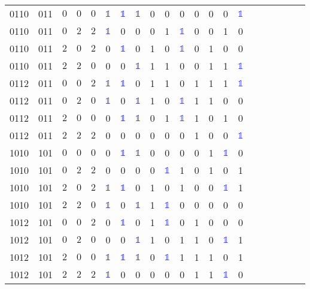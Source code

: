 \begin{longtable*}{c| cccccccccccccccccccc }
0110& 011& $0$& $0$& $0$& \textcolor{blue}{$\mathds{1}$}& \textcolor{blue}{$\mathds{1}$}& \textcolor{blue}{$\mathds{1}$}& 0& 0& 0& 0& 0& 0& \textcolor{blue}{$\mathds{1}$}\\
0110& 011& $0$& $2$& $2$& \textcolor{blue}{$\mathds{1}$}& 0& 0& 0& 1& \textcolor{blue}{$\mathds{1}$}& 0& 0& 1& 0\\
0110& 011& $2$& $0$& $2$& 0& \textcolor{blue}{$\mathds{1}$}& 0& 1& 0& \textcolor{blue}{$\mathds{1}$}& 0& 1& 0& 0\\
0110& 011& $2$& $2$& $0$& 0& 0& \textcolor{blue}{$\mathds{1}$}& 1& 1& 0& 0& 1& 1& \textcolor{blue}{$\mathds{1}$}\\
0112& 011& $0$& $0$& $2$& \textcolor{blue}{$\mathds{1}$}& \textcolor{blue}{$\mathds{1}$}& 0& 1& 1& 0& 1& 1& 1& \textcolor{blue}{$\mathds{1}$}\\
0112& 011& $0$& $2$& $0$& \textcolor{blue}{$\mathds{1}$}& 0& \textcolor{blue}{$\mathds{1}$}& 1& 0& \textcolor{blue}{$\mathds{1}$}& 1& 1& 0& 0\\
0112& 011& $2$& $0$& $0$& 0& \textcolor{blue}{$\mathds{1}$}& \textcolor{blue}{$\mathds{1}$}& 0& 1& \textcolor{blue}{$\mathds{1}$}& 1& 0& 1& 0\\
0112& 011& $2$& $2$& $2$& 0& 0& 0& 0& 0& 0& 1& 0& 0& \textcolor{blue}{$\mathds{1}$}\\
1010& 101& $0$& $0$& $0$& 0& \textcolor{blue}{$\mathds{1}$}& \textcolor{blue}{$\mathds{1}$}& 0& 0& 0& 0& 1& \textcolor{blue}{$\mathds{1}$}& 0\\
1010& 101& $0$& $2$& $2$& 0& 0& 0& 0& \textcolor{blue}{$\mathds{1}$}& 1& 0& 1& 0& 1\\
1010& 101& $2$& $0$& $2$& \textcolor{blue}{$\mathds{1}$}& \textcolor{blue}{$\mathds{1}$}& 0& 1& 0& 1& 0& 0& \textcolor{blue}{$\mathds{1}$}& 1\\
1010& 101& $2$& $2$& $0$& \textcolor{blue}{$\mathds{1}$}& 0& \textcolor{blue}{$\mathds{1}$}& 1& \textcolor{blue}{$\mathds{1}$}& 0& 0& 0& 0& 0\\
1012& 101& $0$& $0$& $2$& 0& \textcolor{blue}{$\mathds{1}$}& 0& 1& \textcolor{blue}{$\mathds{1}$}& 0& 1& 0& 0& 0\\
1012& 101& $0$& $2$& $0$& 0& 0& \textcolor{blue}{$\mathds{1}$}& 1& 0& 1& 1& 0& \textcolor{blue}{$\mathds{1}$}& 1\\
1012& 101& $2$& $0$& $0$& \textcolor{blue}{$\mathds{1}$}& \textcolor{blue}{$\mathds{1}$}& \textcolor{blue}{$\mathds{1}$}& 0& \textcolor{blue}{$\mathds{1}$}& 1& 1& 1& 0& 1\\
1012& 101& $2$& $2$& $2$& \textcolor{blue}{$\mathds{1}$}& 0& 0& 0& 0& 0& 1& 1& \textcolor{blue}{$\mathds{1}$}& 0\\

\end{longtable*}
